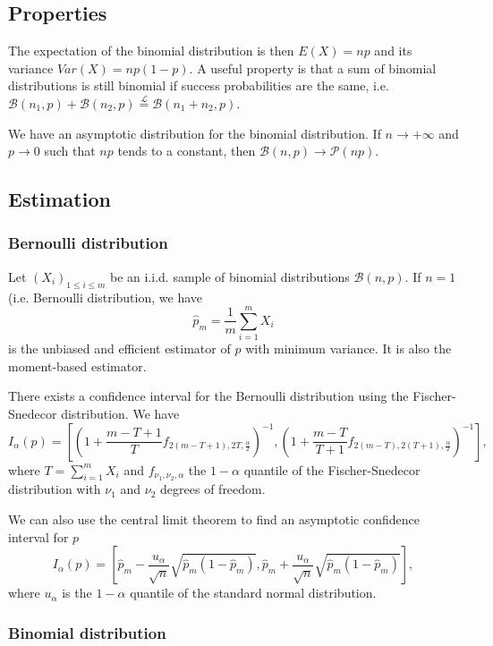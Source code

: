 \subsection{Properties}
The expectation of the binomial distribution is then $E(X) =np$ and its variance $Var(X)=np(1-p)$. A useful property is that a sum of binomial distributions is still binomial if success probabilities are the same, i.e.
$\mathcal B(n_1, p) + \mathcal B(n_2, p) \stackrel{\mathcal L}{=} \mathcal B(n_1+ n_2, p)$.

We have an asymptotic distribution for the binomial distribution. If $n\rightarrow +\infty$ and $p\rightarrow 0$ such that $np$ tends to a constant, then $\mathcal B(n,p) \rightarrow \mathcal P(np)$.

\subsection{Estimation}
\subsubsection{Bernoulli distribution}
Let $(X_i)_{1\leq i\leq m}$ be an i.i.d. sample of binomial distributions $\mathcal B(n,p)$. If $n=1$ (i.e. Bernoulli distribution, we have 
$$
\hat p_m = \frac{1}{m} \sum_{i=1}^m X_i
$$
is the unbiased and efficient estimator of $p$ with minimum variance. It is also the moment-based estimator.

There exists a confidence interval for the Bernoulli distribution using the Fischer-Snedecor distribution. We have
$$
I_\alpha(p) = \left[ \left(1+\frac{m-T+1}{T} f_{2(m-T+1),2T,\frac{\alpha}{2}}\right)^{-1} , \left(1+\frac{m-T}{T+1} f_{2(m-T),2(T+1),\frac{\alpha}{2}}\right)^{-1} \right],
$$
where $T=\sum_{i=1}^m X_i$ and $f_{\nu_1,\nu_2,\alpha}$ the $1-\alpha$ quantile of the Fischer-Snedecor distribution with $\nu_1$ and $\nu_2$ degrees of freedom.

We can also use the central limit theorem to find an asymptotic confidence interval for $p$
$$
I_\alpha(p) = \left[\hat p_m - \frac{u_\alpha}{\sqrt n} \sqrt{\hat p_m(1-\hat p_m)}, \hat p_m + \frac{u_\alpha}{\sqrt n} \sqrt{\hat p_m(1-\hat p_m)} \right],
$$
where $u_\alpha$ is the $1-\alpha$ quantile of the standard normal distribution.

\subsubsection{Binomial distribution}

